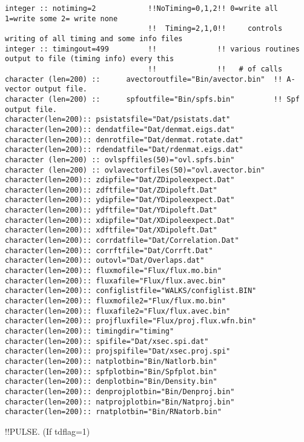 \begin{verbatim}
integer :: notiming=2            !!NoTiming=0,1,2!! 0=write all 1=write some 2= write none
                                 !!  Timing=2,1,0!!     controls writing of all timing and some info files
integer :: timingout=499         !!              !! various routines output to file (timing info) every this 
                                 !!              !!   # of calls
character (len=200) ::      avectoroutfile="Bin/avector.bin"  !! A-vector output file.        
character (len=200) ::      spfoutfile="Bin/spfs.bin"         !! Spf output file.
character(len=200):: psistatsfile="Dat/psistats.dat"
character(len=200):: dendatfile="Dat/denmat.eigs.dat"
character(len=200):: denrotfile="Dat/denmat.rotate.dat"
character(len=200):: rdendatfile="Dat/rdenmat.eigs.dat"
character (len=200) :: ovlspffiles(50)="ovl.spfs.bin"
character (len=200) :: ovlavectorfiles(50)="ovl.avector.bin"
character(len=200):: zdipfile="Dat/ZDipoleexpect.Dat"
character(len=200):: zdftfile="Dat/ZDipoleft.Dat"
character(len=200):: ydipfile="Dat/YDipoleexpect.Dat"
character(len=200):: ydftfile="Dat/YDipoleft.Dat"
character(len=200):: xdipfile="Dat/XDipoleexpect.Dat"
character(len=200):: xdftfile="Dat/XDipoleft.Dat"
character(len=200):: corrdatfile="Dat/Correlation.Dat"
character(len=200):: corrftfile="Dat/Corrft.Dat"
character(len=200):: outovl="Dat/Overlaps.dat"
character(len=200):: fluxmofile="Flux/flux.mo.bin"
character(len=200):: fluxafile="Flux/flux.avec.bin"
character(len=200):: configlistfile="WALKS/configlist.BIN"
character(len=200):: fluxmofile2="Flux/flux.mo.bin"
character(len=200):: fluxafile2="Flux/flux.avec.bin"
character(len=200):: projfluxfile="Flux/proj.flux.wfn.bin"
character(len=200):: timingdir="timing"
character(len=200):: spifile="Dat/xsec.spi.dat"
character(len=200):: projspifile="Dat/xsec.proj.spi"
character(len=200):: natplotbin="Bin/Natlorb.bin"
character(len=200):: spfplotbin="Bin/Spfplot.bin"
character(len=200):: denplotbin="Bin/Density.bin"
character(len=200):: denprojplotbin="Bin/Denproj.bin"
character(len=200):: natprojplotbin="Bin/Natproj.bin"
character(len=200):: rnatplotbin="Bin/RNatorb.bin"
\end{verbatim}
!!{\large \quad PULSE.  (If tdflag=1) }
